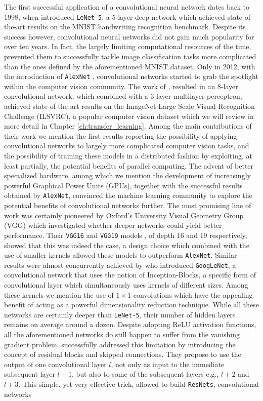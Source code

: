 The first successful application of a convolutional neural network dates back to 1998, when \citet{lecun1998gradient} introduced \texttt{LeNet-5}, a 5-layer deep network which achieved state-of-the-art results on the MNIST handwriting recognition benchmark. Despite its success however, convolutional neural networks did not gain much popularity for over ten years. In fact, the largely limiting computational resources of the time, prevented them to successfully tackle image classification tasks more complicated than the ones defined by the aforementioned MNIST dataset. Only in 2012, with the introduction of \texttt{AlexNet} \cite{krizhevsky2012imagenet}, convolutional networks started to grab the spotlight within the computer vision community.  The work of \citet{krizhevsky2012imagenet}, resulted in an 8-layer convolutional network, which combined with a 3-layer multilayer perceptron, achieved state-of-the-art results on the ImageNet Large Scale Visual Recognition Challenge (ILSVRC), a popular computer vision dataset which we will review in more detail in Chapter \ref{ch:transfer_learning}. Among the main contributions of their work we mention the first results reporting the possibility of applying convolutional networks to largely more complicated computer vision tasks, and the possibility of training these models in a distributed fashion by exploiting, at least partially, the potential benefits of parallel computing. The advent of better specialized hardware, among which we mention the development of increasingly powerful Graphical Power Units (GPUs), together with the successful results obtained by \texttt{AlexNet}, convinced the machine learning community to explore the potential benefits of convolutional networks further. The most promising line of work was certainly pioneered by Oxford's University Visual Geometry Group (VGG) which investigated whether deeper networks could yield better performance. Their \texttt{VGG16} and \texttt{VGG19} models \cite{simonyan2014very}, of depth 16 and 19 respectively, showed that this was indeed the case, a design choice which combined with the use of smaller kernels allowed these models to outperform \texttt{AlexNet}. Similar results were almost concurrently achieved by \citet{szegedy2015going} who introduced \texttt{GoogLeNet}, a convolutional network that uses the notion of Inception-Blocks, a specific form of convolutional layer which simultaneously uses kernels of different sizes. Among these kernels we mention the use of $1\times1$ convolutions which have the appealing benefit of acting as a powerful dimensionality reduction technique. While all these networks are certainly deeper than \texttt{LeNet-5}, their number of hidden layers remains on average around a dozen. Despite adopting ReLU activation functions, all the aforementioned networks do still happen to suffer from the vanishing gradient problem. \citet{he2016deep} successfully addressed this limitation by introducing the concept of residual blocks and skipped connections. They propose to use the output of one convolutional layer $l$, not only as input to the immediate subsequent layer $l+1$, but also to some of the subsequent layers e.g., $l+2$ and $l+3$. This simple, yet very effective trick, allowed \citet{he2016deep} to build \texttt{ResNets}, convolutional networks 